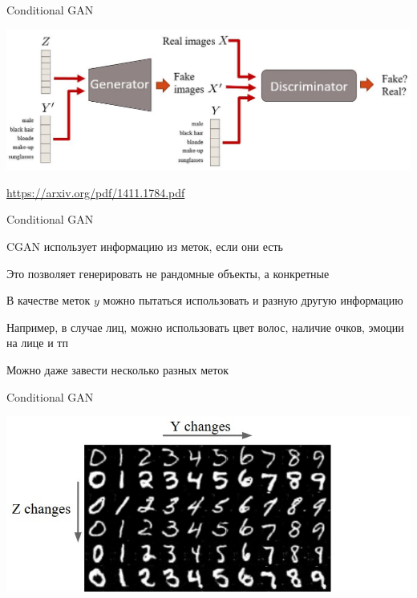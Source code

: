 \documentclass[notes,12pt, aspectratio=169]{beamer}
\newenvironment{wideitemize}{\itemize\addtolength{\itemsep}{10pt}}{\enditemize}
\begin{document}
\begin{frame}{Conditional GAN}
\begin{center}
	\includegraphics[width=.8\linewidth]{cgan.jpeg}
\end{center}
\vfill
\footnotesize
{\color{blue} \url{https://arxiv.org/pdf/1411.1784.pdf}}
\end{frame}

\begin{frame}{Conditional GAN}
\begin{wideitemize}
	\item   CGAN использует информацию из меток, если они есть
	\item   Это позволяет генерировать не рандомные объекты, а конкретные 
	\item   В качестве меток $y$ можно пытаться использовать и разную другую информацию
	\item   Например, в случае лиц, можно использовать цвет волос, наличие очков, эмоции на лице и тп 
	\item   Можно даже завести несколько разных меток 
\end{wideitemize}
\end{frame}

\begin{frame}{Conditional GAN}
\begin{center}
	\includegraphics[width=.8\linewidth]{cgan_example.jpeg}
\end{center}
\end{frame}
\end{document}
